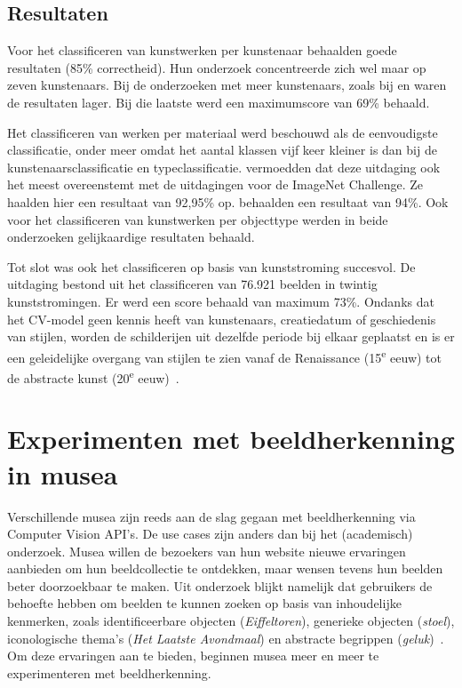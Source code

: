 \subsection{Resultaten}
\label{subsec:cv-voor-ce-resultaten}

Voor het classificeren van kunstwerken per kunstenaar behaalden \textcite{Blessings2013} goede resultaten (85\% correctheid). Hun onderzoek concentreerde zich wel maar op zeven kunstenaars. Bij de onderzoeken met meer kunstenaars, zoals bij \textcite{Mensink2014} en \textcite{Sabatteli2018} waren de resultaten lager. Bij die laatste werd een maximumscore van 69\% behaald.

Het classificeren van werken per materiaal werd beschouwd als de eenvoudigste classificatie, onder meer omdat het aantal klassen vijf keer kleiner is dan bij de kunstenaarsclassificatie en typeclassificatie. \textcite{Sabatteli2018} vermoedden dat deze uitdaging ook het meest overeenstemt met de uitdagingen voor de ImageNet Challenge. Ze haalden hier een resultaat van 92,95\% op. \textcite{Mensink2014} behaalden een resultaat van 94\%. Ook voor het classificeren van kunstwerken per objecttype werden in beide onderzoeken gelijkaardige resultaten behaald.

Tot slot was ook het classificeren op basis van kunststroming succesvol. De uitdaging bestond uit het classificeren van 76.921 beelden in twintig kunststromingen. Er werd een score behaald van maximum 73\%. Ondanks dat het CV-model geen kennis heeft van kunstenaars, creatiedatum of geschiedenis van stijlen, worden de schilderijen uit dezelfde periode bij elkaar geplaatst en is er een geleidelijke overgang van stijlen te zien vanaf de Renaissance (15\textsuperscript{e} eeuw) tot de abstracte kunst (20\textsuperscript{e} eeuw)~\autocite{Elgammal2018}.

\newpage

\section{Experimenten met beeldherkenning in musea}
\label{sec:beeldherkenning-musea}


Verschillende musea zijn reeds aan de slag gegaan met beeldherkenning via Computer Vision API’s. De use cases zijn anders dan bij het (academisch) onderzoek. Musea willen de bezoekers van hun website nieuwe ervaringen aanbieden om hun beeldcollectie te ontdekken, maar wensen tevens hun beelden beter doorzoekbaar te maken. Uit onderzoek blijkt namelijk dat gebruikers de behoefte hebben om beelden te kunnen zoeken op basis van inhoudelijke kenmerken, zoals identificeerbare objecten (\textit{Eiffeltoren}), generieke objecten (\textit{stoel}), iconologische thema’s (\textit{Het Laatste Avondmaal}) en abstracte begrippen (\textit{geluk})~\autocite{Vanstappen2019}. Om deze ervaringen aan te bieden, beginnen musea meer en meer te experimenteren met beeldherkenning.

